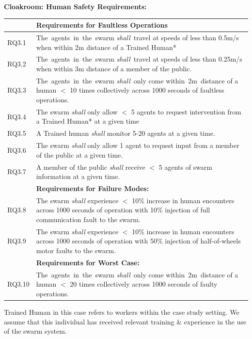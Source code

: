 \documentclass[lettersize,journal]{IEEEtran}
\begin{document}
\newpage
\noindent \textbf{Cloakroom: Human Safety Requirements: }
\begin{center}
	\begin{tabular}{|p{9mm}|p{72mm}|}
		\hline
		& \textbf{Requirements for Faultless Operations} \\
		\hline
		RQ3.1 & The agents in the swarm \emph{shall} travel at speeds of less than 0.5m/s when within 2m distance of a Trained Human*
		\\ 
		\hline
		RQ3.2 & The agents in the swarm \emph{shall} travel at speeds of less than 0.25m/s when within 3m distance of a member of the public.
		\\ 
		\hline
		RQ3.3 & The agents in the swarm \emph{shall} only come within 2m distance of a human $<$ 10 times collectively across 1000 seconds of faultless operations.
		\\ 
		\hline
		RQ3.4 & The swarm \emph{shall} only allow $<$ 5 agents to request intervention from a Trained Human* at a given time
		\\ 
		\hline
		RQ3.5 & A Trained human \emph{shall} monitor 5-20 agents at a given time.
		\\ 
		\hline
		RQ3.6 & The swarm \emph{shall} only allow 1 agent to request input from a member of the public at a given time.
		\\ 
		\hline
		RQ3.7 & A member of the public \emph{shall} receive $<$ 5 agents of swarm information at a given time.
		\\ 
		\hline
		& \textbf{Requirements for Failure Modes: } \\
		\hline
		RQ3.8 & The swarm \emph{shall} experience $<$ 10\% increase in human encounters across 1000 seconds of operation with 10\% injection of full communication fault to the swarm. \\
		\hline
		RQ3.9 & The swarm \emph{shall} experience $<$ 10\% increase in human encounters across 1000 seconds of operation with 50\% injection of half-of-wheels motor faults to the swarm.\\ 
		\hline
		& \textbf{Requirements for Worst Case: } \\
		\hline
		RQ3.10 & The agents in the swarm \emph{shall} only come within 2m distance of a human $<$ 20 times collectively across 1000 seconds of faulty operations.
		\\		[1ex] 		
		\hline
	\end{tabular}
\end{center}
\noindent *Trained Human in this case refers to workers within the case study setting. We assume that this individual has received relevant training \& experience in the use of the swarm system.\\
\end{document}
